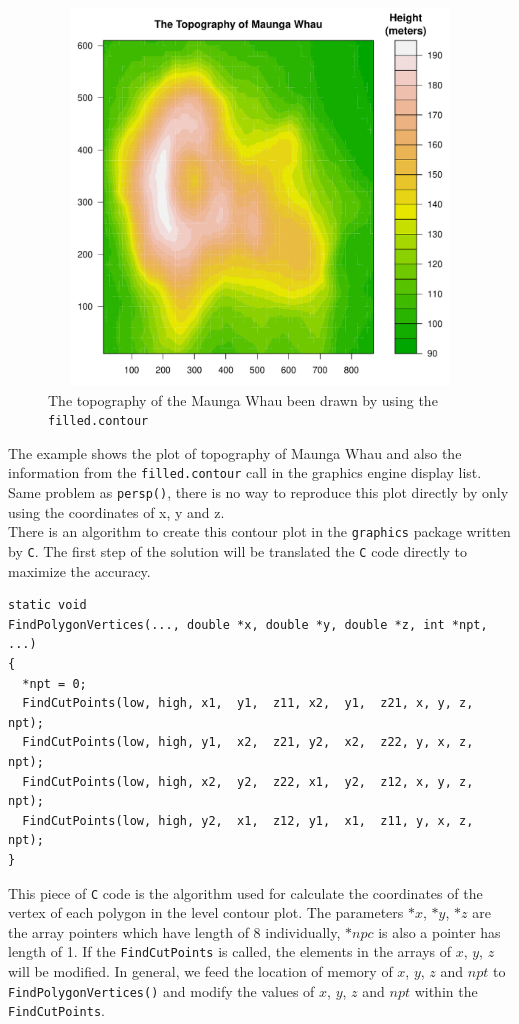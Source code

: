 \documentclass[paper=a4, fontsize=11pt]{report}
\begin{document}
\begin{figure}[h]
\begin{center}
  \includegraphics[height = 10cm, width = 12cm]{figure/filled_example_1.pdf}
  \caption{The topography of the Maunga Whau been drawn by using the \texttt{filled.contour}}
  	\label{figure8}
\end{center}
\end{figure}
The example shows the plot of topography of Maunga Whau and also the information from the \texttt{filled.contour} call in the graphics engine display list. Same problem as \texttt{persp()}, there is no way to reproduce this plot directly by only using the coordinates of x, y and z.\\

There is an algorithm to create this contour plot in the \texttt{graphics} package written by \texttt{C}. The first step of the solution will be translated the \texttt{C} code directly to maximize the accuracy.\\

\begin{lstlisting}
static void
FindPolygonVertices(..., double *x, double *y, double *z, int *npt, ...)
{
  *npt = 0;
  FindCutPoints(low, high, x1,  y1,  z11, x2,  y1,  z21, x, y, z, npt);
  FindCutPoints(low, high, y1,  x2,  z21, y2,  x2,  z22, y, x, z, npt);
  FindCutPoints(low, high, x2,  y2,  z22, x1,  y2,  z12, x, y, z, npt);
  FindCutPoints(low, high, y2,  x1,  z12, y1,  x1,  z11, y, x, z, npt);
}
\end{lstlisting}
This piece of \texttt{C} code is the algorithm used for calculate the coordinates of the vertex of each polygon in the level contour plot. The parameters $*x$, $*y$, $*z$ are the array pointers which have length of 8 individually, $*npc$ is also a pointer has length of 1. If the \texttt{FindCutPoints} is called, the elements in the arrays of $x$, $y$, $z$ will be modified. In general, we feed the location of memory of $x$, $y$, $z$ and $npt$ to \texttt{FindPolygonVertices()} and modify the values of $x$, $y$, $z$ and $npt$ within the \texttt{FindCutPoints}.\\
\end{document}
